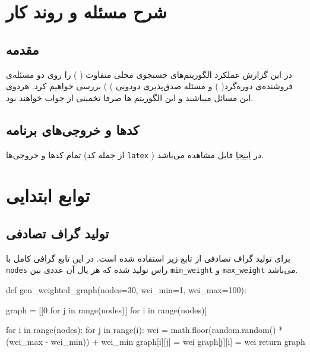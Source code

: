\chapter{شرح مسئله و روند کار}

\section{مقدمه}
در این گزارش عملکرد الگوریتم‌های جستجوی محلی متفاوت (
) را روی دو مسئله‌ی فروشنده‌ی دوره‌گرد(
)
و  مسئله صدق‌پذیری دودویی )
)
 بررسی خواهیم کرد.
 هردوی این مسائل 
میباشند و این الگوریتم ها صرفا تخمینی از جواب خواهند بود.

\section{کدها و خروجی‌های برنامه}
تمام کد‌ها و خروجی‌ها (از جمله کد
\verb;latex;
)
در
\href{https://github.com/atrin-hojjat/Uni-AI-Course-Reports/blob/main/Report\%2003/}{اینجا}
قابل مشاهده می‌باشد.

\chapter{توابع ابتدایی}
\section{تولید گراف تصادفی}
برای تولید گراف تصادفی از تابع زیر استفاده شده است.
در این تابع گرافی کامل با 
\verb;nodes;
راس تولید شده که هر یال آن عددی بین
\verb;min_weight;
و
\verb;max_weight;
می‌باشد.

\begin{latin}
\begin{python}
def gen_weighted_graph(nodes=30, wei_min=1, wei_max=100):

    graph = [[0 for j in range(nodes)] for i in range(nodes)]

    for i in range(nodes):
        for j in range(i):
            wei = math.floor(random.random() * (wei_max - wei_min)) + wei_min
            graph[i][j] = wei
            graph[j][i] = wei
    return graph

\end{python}
\end{latin}
